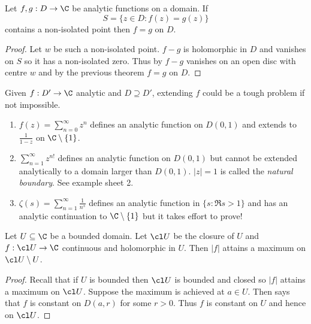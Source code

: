 \documentclass[a4paper]{article}
\begin{document}
\begin{corollary}
  Let \(f, g: D \to \C\) be analytic functions on a domain. If
  \[
    S = \{z \in D: f(z) = g(z)\}
  \]
  contains a non-isolated point then \(f = g\) on \(D\).
\end{corollary}

\begin{proof}
  Let \(w\) be such a non-isolated point. \(f - g\) is holomorphic in \(D\) and vanishes on \(S\) so it has a non-isolated zero. Thus by  \(f - g\) vanishes on an open disc with centre \(w\) and by the previous theorem \(f = g\) on \(D\).
\end{proof}

\begin{remark}
  Given \(f: D' \to \C\) analytic and \(D \supseteq D'\), extending \(f\) could be a tough problem if not impossible.
\end{remark}

\begin{eg}\leavevmode
  \begin{enumerate}
  \item \(f(z) = \sum_{n = 0}^\infty z^n\) defines an analytic function on \(D(0, 1)\) and extends to \(\frac{1}{1 - z}\) on \(\C \setminus \{1\}\).
  \item \(\sum_{n = 1}^\infty z^{n!}\) defines an analytic function on \(D(0, 1)\) but cannot be extended analytically to a domain larger than \(D(0, 1)\). \(|z| = 1\) is called the \emph{natural boundary}. See example sheet 2.
  \item \(\zeta(s) = \sum_{n = 1}^\infty \frac{1}{n^s}\) defines an analytic function in \(\{s: \Re s > 1\}\) and has an analytic continuation to \(\C \setminus \{1\}\) but it takes effort to prove!
  \end{enumerate}
\end{eg}

\begin{corollary}
  Let \(U \subseteq \C\) be a bounded domain. Let \(\cl U\) be the closure of \(U\) and \(f: \cl U \to \C\) continuous and holomorphic in \(U\). Then \(|f|\) attains a maximum on \(\cl U \setminus U\).
\end{corollary}

\begin{proof}
  Recall that if \(U\) is bounded then \(\cl U\) is bounded and closed so \(|f|\) attains a maximum on \(\cl U\). Suppose the maximum is achieved at \(a \in U\). Then  says that \(f\) is constant on \(D(a, r)\) for some \(r > 0\). Thus \(f\) is constant on \(U\) and hence on \(\cl U\).
\end{proof}
\end{document}
